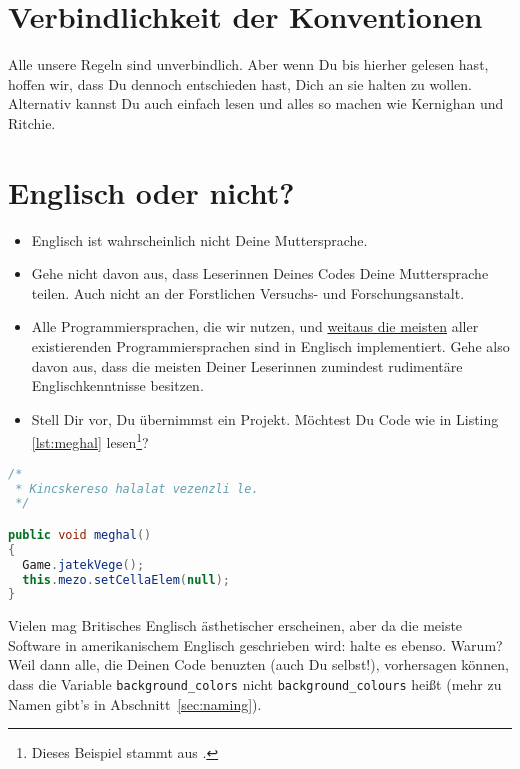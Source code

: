 \documentclass[twoside]{scrreprt}
\providecommand{\code}[1]{\texttt{#1}}
\providecommand{\FVA}[1]{Forstliche#1 Versuchs- und Forschungs\-anstalt}
\begin{document}
\section{Verbindlichkeit der Konventionen\label{sec:zwang}}
Alle unsere Regeln sind unverbindlich. Aber wenn Du bis hierher gelesen hast,
hoffen wir, dass Du dennoch entschieden hast, Dich an sie halten zu wollen.
Alternativ kannst Du auch einfach \cite{KR} lesen und alles so machen wie
Kernighan und Ritchie.

\section{Englisch oder nicht?}
\begin{itemize}
\item Englisch ist wahrscheinlich nicht Deine Muttersprache.
\end{itemize}
\begin{itemize}
\item Gehe nicht davon aus, dass Leserinnen Deines Codes Deine
    Muttersprache teilen. Auch nicht an der \FVA{n}.
\item Alle Programmiersprachen, die wir nutzen, und
  \href{http://en.wikipedia.org/wiki/Non-English-based_programming_languages}
  {weitaus die meisten}
  aller existierenden Programmiersprachen sind in Englisch implementiert.
  Gehe also davon aus, dass die meisten Deiner Leserinnen zumindest 
  rudiment\"a{}re Englischkenntnisse besitzen.
\item Stell Dir vor, Du \"u{}bernimmst ein Projekt. M\"o{}chtest Du Code wie
    in Listing \ref{lst:meghal}
    lesen\footnote{Dieses Beispiel stammt aus \cite{wsp}.}?
\end{itemize}
\begin{lstlisting}[float=h, label=lst:meghal, language=Java]
/*
 * Kincskereso halalat vezenzli le.
 */

public void meghal()
{
  Game.jatekVege();
  this.mezo.setCellaElem(null);
}
\end{lstlisting}

 Vielen mag Britisches Englisch \"a{}sthetischer
erscheinen, aber da die meiste Software in amerikanischem Englisch geschrieben
wird: halte es ebenso. Warum? Weil dann alle, die Deinen Code benuzten
(auch Du selbst!), vorhersagen k\"o{}nnen, dass die Variable
\code{background\_colors} nicht \code{background\_colours} hei\ss{}t (mehr zu
Namen gibt's in Abschnitt~\ref{sec:naming}).
\end{document}
